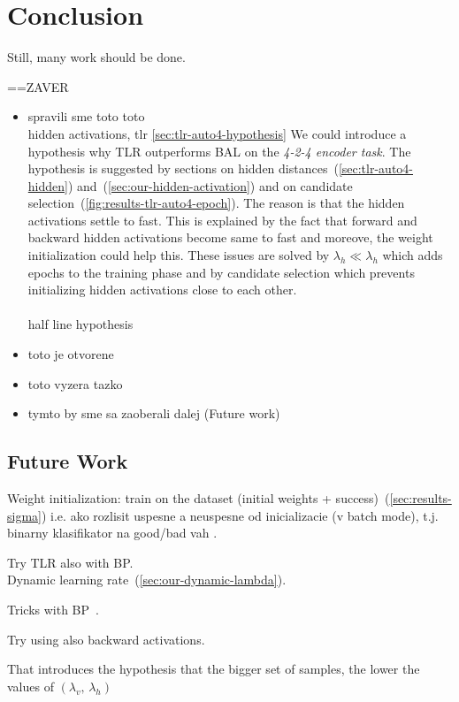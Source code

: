 \section*{Conclusion}
\label{sec:conclusion} 

Still, many work should be done. 


==ZAVER 
\begin{itemize} 
\item   spravili sme toto toto \\ 
hidden activations, tlr \ref{sec:tlr-auto4-hypothesis} 
We could introduce a hypothesis why TLR outperforms BAL on the \emph{4-2-4 encoder task}. The hypothesis is suggested by sections on hidden distances~(\ref{sec:tlr-auto4-hidden}) and~(\ref{sec:our-hidden-activation}) and on candidate selection~(\ref{fig:results-tlr-auto4-epoch}). The reason is that the hidden activations settle to fast. This is explained by the fact that forward and backward hidden activations become same to fast and moreove, the weight initialization could help this. These issues are solved by $\lambda_h \ll \lambda_h$ which adds epochs to the training phase and by candidate selection which prevents initializing hidden activations close to each other. \\
\\
half line hypothesis 
\item   toto je otvorene
\item   toto vyzera tazko
\item   tymto by sme sa zaoberali dalej (Future work) 

\end{itemize} 


\subsection*{Future Work} 
\label{sec:future-work}
Weight initialization: train on the dataset (initial weights + success)~(\ref{sec:results-sigma}) 
i.e. ako rozlisit uspesne a neuspesne od inicializacie (v batch mode), t.j. binarny klasifikator na good/bad vah . 

Try TLR also with BP.  \\ 

\label{sec:future-dlr} 
Dynamic learning rate~(\ref{sec:our-dynamic-lambda}). 

Tricks with BP~\citep{lecun2012efficient}. 

Try using also backward activations.

That introduces the hypothesis that the bigger set of samples, the lower the values of $(\lambda_v,\, \lambda_h)$

